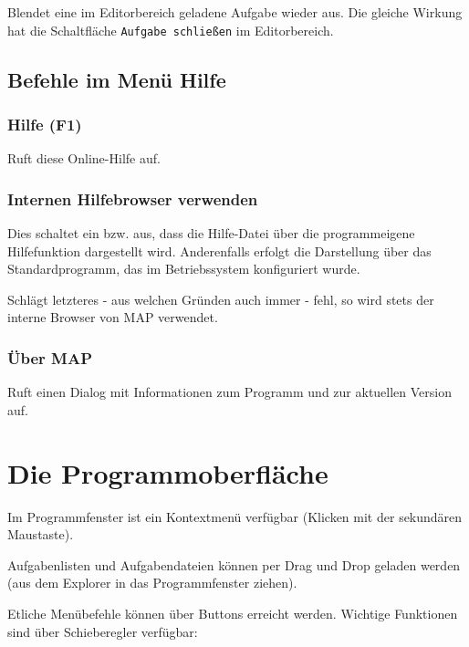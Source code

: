 \documentclass[a4paper,DIV=11
]{scrartcl}
\begin{document}
Blendet eine im Editorbereich geladene Aufgabe wieder aus. Die gleiche
Wirkung hat die Schaltfläche \texttt{Aufgabe\ schließen} im
Editorbereich.

\hypertarget{befehle-im-menuxfc-hilfe}{%
\subsection{Befehle im Menü Hilfe}\label{befehle-im-menuxfc-hilfe}}

\hypertarget{hilfe-f1}{%
\subsubsection{Hilfe (F1)}\label{hilfe-f1}}

Ruft diese Online-Hilfe auf.

\hypertarget{internen-hilfebrowser-verwenden}{%
\subsubsection{Internen Hilfebrowser
verwenden}\label{internen-hilfebrowser-verwenden}}

Dies schaltet ein bzw. aus, dass die Hilfe-Datei über die programmeigene
Hilfefunktion dargestellt wird. Anderenfalls erfolgt die Darstellung
über das Standardprogramm, das im Betriebssystem konfiguriert wurde.

Schlägt letzteres - aus welchen Gründen auch immer - fehl, so wird stets
der interne Browser von MAP verwendet.

\hypertarget{uxfcber-map}{%
\subsubsection{Über MAP}\label{uxfcber-map}}

Ruft einen Dialog mit Informationen zum Programm und zur aktuellen
Version auf.

\hypertarget{die-programmoberfluxe4che}{%
\section{Die Programmoberfläche}\label{die-programmoberfluxe4che}}

Im Programmfenster ist ein Kontextmenü verfügbar (Klicken mit der
sekundären Maustaste).

Aufgabenlisten und Aufgabendateien können per Drag und Drop geladen
werden (aus dem Explorer in das Programmfenster ziehen).

Etliche Menübefehle können über Buttons erreicht werden. Wichtige
Funktionen sind über Schieberegler verfügbar:
\end{document}
